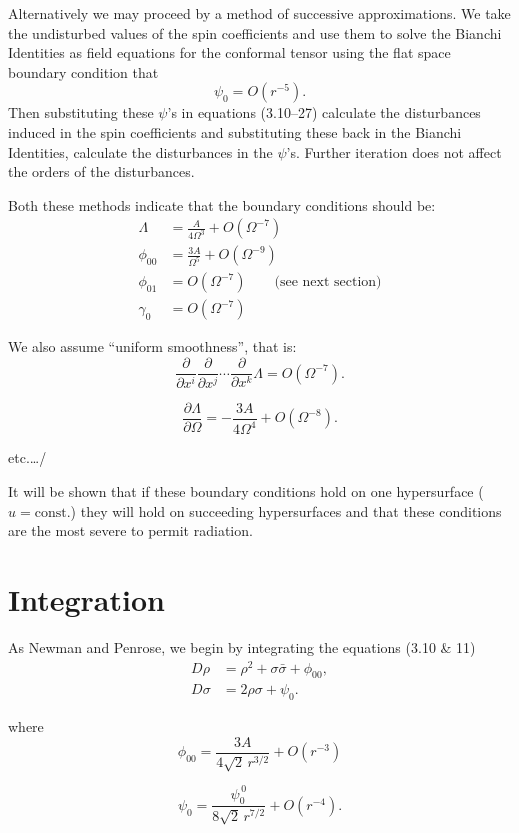 Alternatively we may proceed by a method of successive approximations. We take the undisturbed values of the spin
coefficients and use them to solve the Bianchi Identities as
field equations for the conformal tensor using the flat space
boundary condition that
\[
\psi_0 = O(r^{-5}).
\]
Then substituting these $\psi$'s in equations (3.10--27) calculate
the disturbances induced in the spin coefficients and substituting
these back in the Bianchi Identities, calculate the disturbances in
the $\psi$'s. Further iteration does not affect the orders
of the disturbances.

Both these methods indicate that the boundary conditions
should be:
\begin{align}
\Lambda
    &= \frac{A}{4\Omega^3} + O(\Omega^{-7})
    \tag{5.1}\\[6pt]
\phi_{00}
    &= \frac{3A}{\Omega^5} + O(\Omega^{-9})
    \tag{5.2}\\[6pt]
\phi_{01}
    &= O(\Omega^{-7})
    \qquad \text{(see next section)}
    \tag{5.3}\\[6pt]
\gamma_0
    &= O(\Omega^{-7})
    \tag{5.4}
\end{align}

We also assume ``uniform smoothness'', that is:
\[
\frac{\partial}{\partial x^i}
\frac{\partial}{\partial x^j}
\cdots
\frac{\partial}{\partial x^k}
\Lambda
=
O(\Omega^{-7}).
\]

\[
\frac{\partial \Lambda}{\partial \Omega}
=
-\frac{3A}{4\Omega^4}
+ O(\Omega^{-8}).
\]

\hfill etc.\ldots/


It will be shown that if these boundary conditions
hold on one hypersurface ($u = \mathrm{const.}$) they will hold on
succeeding hypersurfaces and that these conditions are the
most severe to permit radiation.

\section{Integration}

As Newman and Penrose, we begin by integrating the
equations (3.10 \& 11)
\begin{align}
D\rho &= \rho^2 + \sigma\bar{\sigma} + \phi_{00},\\
D\sigma &= 2\rho\sigma + \psi_0.
\end{align}

where
\[
\phi_{00}
=
\frac{3A}{4\sqrt{2}\,r^{3/2}}
+ O(r^{-3})
\]

\[
\psi_0
=
\frac{\psi_0^{\,0}}
     {8\sqrt{2}\,r^{7/2}}
+ O(r^{-4}).
\]

